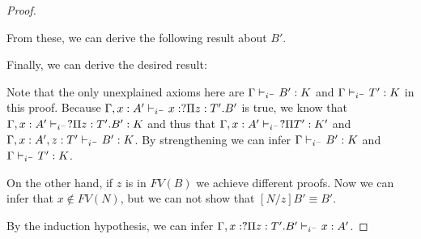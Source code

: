 \begin{proof}
\begin{prooftree}
\end{prooftree}

\begin{prooftree}
\end{prooftree}

From these, we can derive the following result about $B'$.

\begin{prooftree}



\end{prooftree}

Finally, we can derive the desired result:

\begin{prooftree}



\end{prooftree}

Note that the only unexplained axioms here are 
$\Gamma \judgeCI B': K$ and $\Gamma \judgeCI T' : K$ in this proof.
Because $\Gamma, x : A' \judgeCI x : ?\Pi z:T' . B'$ is true, we know that 
$\Gamma, x : A' \judgeCI ?\Pi z : T' . B' : K$ and thus that 
$\Gamma,x : A' \judgeCI ?\Pi T' : K' $ and $\Gamma, x : A', z : T' \judgeCI B' : K$.  
By strengthening we can infer $\Gamma \judgeCI B': K$ and $\Gamma \judgeCI T' : K$.


On the other hand, if $z$ is in $FV(B)$ we achieve different proofs.  
Now we can infer that $x \notin FV(N)$, but we can not show that $[N/z]B' \equiv B'$.

By the induction hypothesis, we can infer $\Gamma , x : ?\Pi z : T' . B'\judgeCI x : A'$.


\end{proof}
